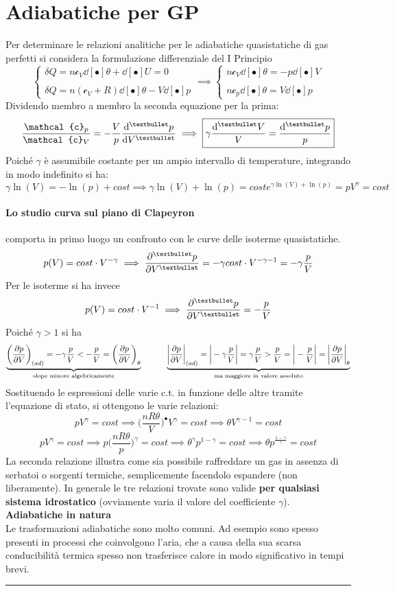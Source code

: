 \documentclass[10pt, oneside]{book}
\newcommand{\infobox}[2]{\vspace{0.5cm}~\\ \textbf{#1} \hrulefill \vspace{0.2cm}\\#2 {}\,\\\hrule \vspace{0.5cm}}
\newcommand{\molhtv}{\mathcal{c}_V }
\newcommand{\molhtp}{\mathcal{c}_p }
\begin{document}
\section{Adiabatiche per GP}
Per determinare le relazioni analitiche per le adiabatiche quasistatiche di gas perfetti si considera la formulazione differenziale del I Principio
\[ \begin{cases} \displaystyle  \delta Q = n \molhtv \dd[•]{\theta} + \dd[•]{U} = 0 \\ \\ \displaystyle \delta Q = n (\molhtv + R) \dd[•]{\theta} - V \dd[•]{p}
\end{cases} \implies \begin{cases} \displaystyle n \molhtv \dd[•]{\theta} = -p \dd[•]{V} \\ \\ \displaystyle n \molhtp \dd[•]{\theta} = V \dd[•]{p}
\end{cases} \]
Dividendo membro a membro la seconda equazione per la prima: 
\[\frac{\molhtp}{\molhtv} = - \frac{V}{p} \dv[•]{p}{V} \implies \boxed{\gamma \frac{\dd[•]{V}}{V} = \frac{\dd[•]{p}}{p}}\]
Poiché $\gamma$ è assumibile costante per un ampio intervallo di temperature, integrando in modo indefinito si ha:
\[\gamma \ln(V) = -\ln(p) + cost \implies \gamma \ln(V) + \ln(p) = cost e^{\gamma \ln(V) + \ln(p)} = pV^\gamma = cost\]
\paragraph{Lo studio curva sul piano di Clapeyron} comporta in primo luogo un confronto con le curve delle isoterme quasistatiche.
\[p(V) = cost \cdot V^{-\gamma} \implies \pdv[•]{p}{V} = - \gamma cost \cdot V^{- \gamma -1} = - \gamma \frac{p}{V}\]
Per le isoterme si ha invece
\[p(V) = cost \cdot V^{-1} \implies \pdv[•]{p}{V} = - \frac{p}{V}\]
Poiché $\gamma > 1$ si ha
\[\underbrace{\bigg(\pdv{p}{V}\bigg)_{(ad)} = - \gamma \frac{p}{V} < - \frac{p}{V} = \bigg(\pdv{p}{V}\bigg)_\theta}_{\textrm{slope minore algebricamente}} \quad \quad \quad \underbrace{\bigg|\pdv{p}{V}\bigg|_{(ad)} = \bigg|- \gamma \frac{p}{V}\bigg| = \gamma \frac{p}{V} > \frac{p}{V} = \bigg|- \frac{p}{V}\bigg| = \bigg| \pdv{p}{V}\bigg|_\theta}_{\textrm{ma maggiore in valore assoluto}}\]
Sostituendo le espressioni delle varie c.t. in funzione delle altre tramite l'equazione di stato, si ottengono le varie relazioni:
\[p V^\gamma = cost \implies \bigg(\frac{nR\theta}{V}\bigg)^{•}V^\gamma = cost \implies \boxed{\theta V^{\gamma -1} = cost}\]
\[pV^\gamma = cost \implies p \bigg(\frac{nR\theta}{p}\bigg)^{\gamma} = cost \implies \theta^\gamma p^{1-\gamma} = cost \implies \boxed{\theta p^{\frac{1-\gamma}{\gamma}} = cost}\]
La seconda relazione illustra come sia possibile raffreddare un gas in assenza di serbatoi o sorgenti termiche, semplicemente facendolo espandere (non liberamente). In generale le tre relazioni trovate sono valide \textbf{per qualsiasi sistema idrostatico} (ovviamente varia il valore del coefficiente $\gamma$).
\infobox{Adiabatiche in natura}{Le trasformazioni adiabatiche sono molto comuni. Ad esempio sono spesso presenti in processi che coinvolgono l'aria, che a causa della sua scarsa conducibilità termica spesso non trasferisce calore in modo significativo in tempi brevi.}
\end{document}
